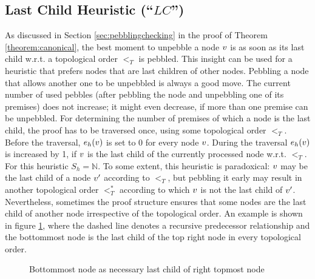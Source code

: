 \documentclass{llncs}
\begin{document}
\subsection{Last Child Heuristic (``$LC$'')}
\label{sec:lastchild}

As discussed in Section \ref{sec:pebblingchecking} in the proof of Theorem \ref{theorem:canonical}, the best moment to unpebble a node $v$ is as soon as its last child w.r.t. a topological order $<_T$ is pebbled. 
This insight can be used for a heuristic that prefers nodes that are last children of other nodes. Pebbling a node that allows another one to be unpebbled is always a good move. 
The current number of used pebbles (after pebbling the node and unpebbling one of its premises) does not increase; 
it might even decrease, if more than one premise can be unpebbled.
For determining the number of premises of which a node is the last child, the proof has to be traversed once, using some topological order $<_T$.
Before the traversal, $e_h(v)$ is set to 0 for every node $v$. During the traversal $e_h(v)$ is increased by 1, if $v$ is the last child of the currently processed node w.r.t. $<_T$. For this heuristic $S_h = \mathbb{N}$.
To some extent, this heuristic is paradoxical: $v$ may be the last child of a node $v'$ according to $<_T$, but pebbling it early may result in another topological order $<^*_T$ according to which $v$ is not the last child of $v'$.
Nevertheless, sometimes the proof structure ensures that some nodes are the last child of another node irrespective of the topological order. An example is shown in figure \ref{fig:forcedLC}, where the dashed line denotes a recursive predecessor relationship and the bottommost node is the last child of the top right node in every topological order.

\begin{figure}[h]
	\caption{Bottommost node as necessary last child of right topmost node}
	\label{fig:forcedLC}
\end{figure}
\end{document}
